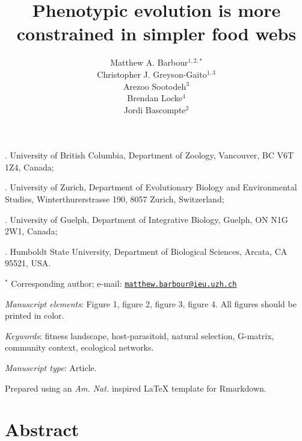 \documentclass[11pt,]{article}
\title{Phenotypic evolution is more constrained in simpler food webs}
\author{Matthew A. Barbour\(^{1,2,\ast}\) \\ Christopher J. Greyson-Gaito\(^{1,3}\) \\ Arezoo Sootodeh\(^{3}\) \\ Brendan Locke\(^{4}\) \\ Jordi Bascompte\(^{2}\)}
\date{}
\begin{document}
\maketitle


. University of British Columbia, Department of Zoology,
Vancouver, BC V6T 1Z4, Canada;

. University of Zurich, Department of Evolutionary Biology
and Environmental Studies, Winterthurerstrasse 190, 8057 Zurich,
Switzerland;

. University of Guelph, Department of Integrative Biology,
Guelph, ON N1G 2W1, Canada;

. Humboldt State University, Department of Biological
Sciences, Arcata, CA 95521, USA.

\(^\ast\) Corresponding author; e-mail:
\href{mailto:matthew.barbour@ieu.uzh.ch}{\nolinkurl{matthew.barbour@ieu.uzh.ch}}

\bigskip

\emph{Manuscript elements}: Figure 1, figure 2, figure 3, figure 4. All
figures should be printed in color.

\bigskip

\emph{Keywords}: fitness landscape, host-parasitoid, natural selection,
G-matrix, community context, ecological networks.

\bigskip

\emph{Manuscript type}: Article.

\bigskip

\footnotesize Prepared using an \emph{Am. Nat.} inspired \LaTeX{}
template for Rmarkdown. \normalsize

\linenumbers{} \modulolinenumbers[3]

\newpage

\section{Abstract}\label{abstract}
\end{document}

